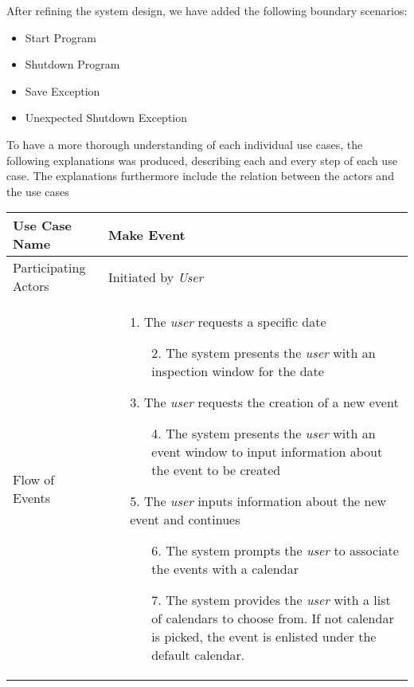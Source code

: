 After refining the system design, we have added the following boundary scenarios:
\begin{itemize}
	\setlength{\itemsep}{-5pt}
	
	\item Start Program
	\item Shutdown Program
	\item Save Exception
	\item Unexpected Shutdown Exception
\end{itemize}

To have a more thorough understanding of each individual use cases, the following explanations was produced, describing each and every step of each use case.
The explanations furthermore include the relation between the actors and the use cases

\begin{center}
	\begin{tabular}{ | l | p{10cm} |  }
		 \hline
		Use Case Name & Make Event \\ \hline
		Participating Actors & Initiated by \emph{User} \\ \hline
		Flow of Events & \begin{enumerate}
						\item[1.] The \emph{user} requests a specific date
						\begin{enumerate}
							\item[2.] The system presents the \emph{user} with an inspection window for the date
						\end{enumerate}
						\item[3.] The \emph{user} requests the creation of a new event
						\begin{enumerate}
							\item[4.] The system presents the \emph{user} with an event window to input information about the event           to be created
						\end{enumerate}
						\item[5.] The \emph{user} inputs information about the new event and continues
						\begin{enumerate}
							\item[6.] The system prompts the \emph{user} to associate the events with a calendar
							\item[7.] The system provides the \emph{user} with a list of calendars to choose from. If not calendar is picked, the event is enlisted under the default calendar.
						\end{enumerate}

\end{enumerate}
\end{tabular}
\end{center}
